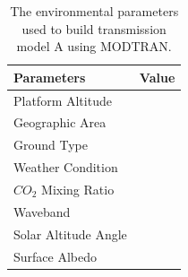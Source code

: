 \begin{table}[H]
\centering
\caption{The environmental parameters used to build transmission model A using MODTRAN.}
\label{tab:modtran-A}
\begin{tabular}{@{}ll@{}}
\toprule
Parameters            & Value \\ \midrule
Platform Altitude     &       \\
Geographic Area       &       \\
Ground Type           &       \\
Weather Condition     &       \\
${CO_2}$ Mixing Ratio &       \\
Waveband              &       \\
Solar Altitude Angle  &       \\
Surface Albedo        &       \\ \bottomrule
\end{tabular}
\end{table}
